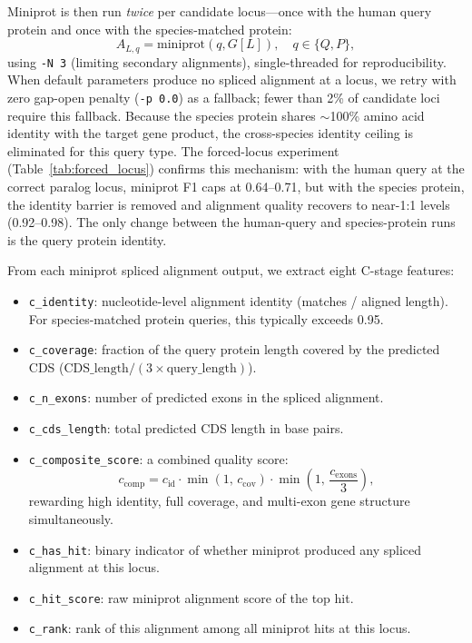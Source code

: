 Miniprot is then run \emph{twice} per candidate locus---once with the human query protein and once with the species-matched protein:
\begin{equation}
A_{L, q} = \text{miniprot}(q, G[L]), \quad q \in \{Q, P\},
\label{eq:dual_query}
\end{equation}
using \texttt{-N~3} (limiting secondary alignments), single-threaded for reproducibility. When default parameters produce no spliced alignment at a locus, we retry with zero gap-open penalty (\texttt{-p~0.0}) as a fallback; fewer than 2\% of candidate loci require this fallback. Because the species protein shares $\sim$100\% amino acid identity with the target gene product, the cross-species identity ceiling is eliminated for this query type. The forced-locus experiment (Table~\ref{tab:forced_locus}) confirms this mechanism: with the human query at the correct paralog locus, miniprot F1 caps at 0.64--0.71, but with the species protein, the identity barrier is removed and alignment quality recovers to near-1:1 levels (0.92--0.98). The only change between the human-query and species-protein runs is the query protein identity.

From each miniprot spliced alignment output, we extract eight C-stage features:
\begin{itemize}
    \item \texttt{c\_identity}: nucleotide-level alignment identity (matches / aligned length). For species-matched protein queries, this typically exceeds 0.95.
    \item \texttt{c\_coverage}: fraction of the query protein length covered by the predicted CDS ($\text{CDS\_length} / (3 \times \text{query\_length})$).
    \item \texttt{c\_n\_exons}: number of predicted exons in the spliced alignment.
    \item \texttt{c\_cds\_length}: total predicted CDS length in base pairs.
    \item \texttt{c\_composite\_score}: a combined quality score:
\begin{equation}
c_{\mathrm{comp}} = c_{\mathrm{id}} \cdot \min(1,\,c_{\mathrm{cov}}) \cdot \min\!\left(1,\,\frac{c_{\mathrm{exons}}}{3}\right),
\label{eq:composite}
\end{equation}
rewarding high identity, full coverage, and multi-exon gene structure simultaneously.
    \item \texttt{c\_has\_hit}: binary indicator of whether miniprot produced any spliced alignment at this locus.
    \item \texttt{c\_hit\_score}: raw miniprot alignment score of the top hit.
    \item \texttt{c\_rank}: rank of this alignment among all miniprot hits at this locus.
\end{itemize}

